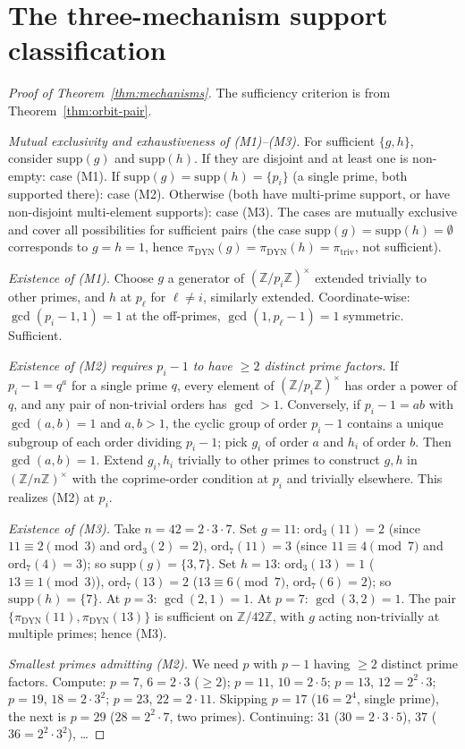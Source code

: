 \documentclass[11pt,reqno]{amsart}
\theoremstyle{plain}
\theoremstyle{definition}
\newcommand{\Z}{\mathbb{Z}}
\newcommand{\Zns}{(\Z/n\Z)^{\times}}
\newcommand{\triv}{\mathrm{triv}}
\newcommand{\DYN}{\mathrm{DYN}}
\newcommand{\supp}{\mathrm{supp}}
\newcommand{\ord}{\mathrm{ord}}
\begin{document}
\section{The three-mechanism support classification}

\begin{proof}[Proof of Theorem~\ref{thm:mechanisms}]
The sufficiency criterion is from Theorem~\ref{thm:orbit-pair}.

\emph{Mutual exclusivity and exhaustiveness of (M1)--(M3).} For sufficient $\{g, h\}$, consider $\supp(g)$ and $\supp(h)$. If they are disjoint and at least one is non-empty: case (M1). If $\supp(g) = \supp(h) = \{p_i\}$ (a single prime, both supported there): case (M2). Otherwise (both have multi-prime support, or have non-disjoint multi-element supports): case (M3). The cases are mutually exclusive and cover all possibilities for sufficient pairs (the case $\supp(g) = \supp(h) = \emptyset$ corresponds to $g = h = 1$, hence $\pi_{\DYN}(g) = \pi_{\DYN}(h) = \pi_{\triv}$, not sufficient).

\emph{Existence of (M1).} Choose $g$ a generator of $(\Z/p_i\Z)^{\times}$ extended trivially to other primes, and $h$ at $p_{\ell}$ for $\ell \neq i$, similarly extended. Coordinate-wise: $\gcd(p_i - 1, 1) = 1$ at the off-primes, $\gcd(1, p_{\ell} - 1) = 1$ symmetric. Sufficient.

\emph{Existence of (M2) requires $p_i - 1$ to have $\geq 2$ distinct prime factors.} If $p_i - 1 = q^a$ for a single prime $q$, every element of $(\Z/p_i\Z)^{\times}$ has order a power of $q$, and any pair of non-trivial orders has $\gcd > 1$. Conversely, if $p_i - 1 = a b$ with $\gcd(a, b) = 1$ and $a, b > 1$, the cyclic group of order $p_i - 1$ contains a unique subgroup of each order dividing $p_i - 1$; pick $g_i$ of order $a$ and $h_i$ of order $b$. Then $\gcd(a, b) = 1$. Extend $g_i, h_i$ trivially to other primes to construct $g, h$ in $\Zns$ with the coprime-order condition at $p_i$ and trivially elsewhere. This realizes (M2) at $p_i$.

\emph{Existence of (M3).} Take $n = 42 = 2 \cdot 3 \cdot 7$. Set $g = 11$: $\ord_3(11) = 2$ (since $11 \equiv 2 \pmod 3$ and $\ord_3(2) = 2$), $\ord_7(11) = 3$ (since $11 \equiv 4 \pmod 7$ and $\ord_7(4) = 3$); so $\supp(g) = \{3, 7\}$. Set $h = 13$: $\ord_3(13) = 1$ ($13 \equiv 1 \pmod 3$), $\ord_7(13) = 2$ ($13 \equiv 6 \pmod 7$, $\ord_7(6) = 2$); so $\supp(h) = \{7\}$. At $p = 3$: $\gcd(2, 1) = 1$. At $p = 7$: $\gcd(3, 2) = 1$. The pair $\{\pi_{\DYN}(11), \pi_{\DYN}(13)\}$ is sufficient on $\Z/42\Z$, with $g$ acting non-trivially at multiple primes; hence (M3).

\emph{Smallest primes admitting (M2).} We need $p$ with $p - 1$ having $\geq 2$ distinct prime factors. Compute: $p = 7$, $6 = 2 \cdot 3$ ($\geq 2$); $p = 11$, $10 = 2 \cdot 5$; $p = 13$, $12 = 2^2 \cdot 3$; $p = 19$, $18 = 2 \cdot 3^2$; $p = 23$, $22 = 2 \cdot 11$. Skipping $p = 17$ ($16 = 2^4$, single prime), the next is $p = 29$ ($28 = 2^2 \cdot 7$, two primes). Continuing: $31$ ($30 = 2 \cdot 3 \cdot 5$), $37$ ($36 = 2^2 \cdot 3^2$), \ldots
\end{proof}
\end{document}
